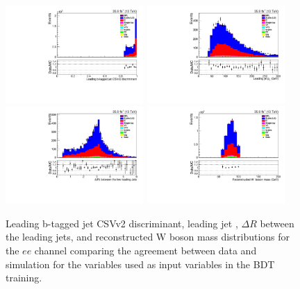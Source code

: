 \begin{figure}[htb]
\centering
\includegraphics[width=0.47\textwidth]{figs/background-estimation/plots/unblinded/prompt_ee_ttbarInc/bTagDisc_NPL_ee_wMass_ee.pdf}
\includegraphics[width=0.47\textwidth]{figs/background-estimation/plots/unblinded/prompt_ee_ttbarInc/leadingJetPt_NPL_ee_wMass_ee.pdf}
\\
\includegraphics[width=0.47\textwidth]{figs/background-estimation/plots/unblinded/prompt_ee_ttbarInc/jjDelR_NPL_ee_wMass_ee.pdf}
\includegraphics[width=0.47\textwidth]{figs/background-estimation/plots/unblinded/prompt_ee_ttbarInc/wPairMass_NPL_ee_wMass_ee.pdf}
\caption{
Leading b-tagged jet CSVv2 discriminant, leading jet \pT, $\Delta R$ between the leading jets, and reconstructed W boson mass distributions for the $ee$ channel comparing the agreement between data and simulation for the variables used as input variables in the BDT training.}
\label{fig:appInputFeaturesDataSimAgreement1}
\end{figure}

